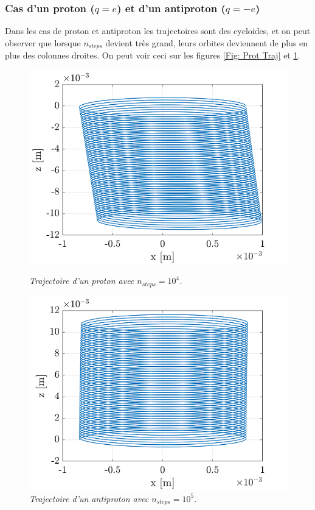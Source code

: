 \documentclass[a4paper,12pt,twoside]{article}
\begin{document}
\subsubsection{Cas d'un proton ($q = e$) et d'un antiproton ($q = -e$)}
Dans les cas de proton et antiproton les trajectoires sont des cyclo\:ides, et on peut observer que lorsque $n_{steps}$ devient tr\`es grand, leurs orbites deviennent de plus en plus des colonnes droites. On peut voir ceci sur les figures \ref{Fig: Prot Traj} et \ref{Fig: Anti Traj}.
\begin{figure}[h]
				\begin{minipage}[c]{.46\linewidth}
					\centering
					\includegraphics[scale = 0.6]{proton_traj.png}
					\caption{\em\label{Fig: Prot Traj} Trajectoire d'un proton avec $n_{steps} = 10^4$.}
				\end{minipage}
				\hfill%
				\begin{minipage}[c]{.46\linewidth}
					\centering
					\includegraphics[scale = 0.6]{antiproton_traj.png}
					\caption{\em\label{Fig: Anti Traj} Trajectoire d'un antiproton avec $n_{steps} = 10^5$.}
				\end{minipage}
			\end{figure}
\end{document}
